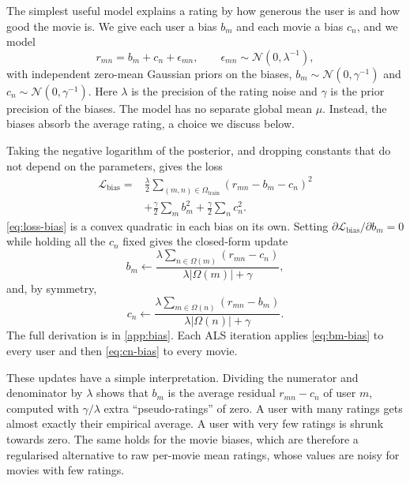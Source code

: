 \documentclass{article}
\theoremstyle{plain}
\theoremstyle{definition}
\theoremstyle{remark}
\begin{document}
The simplest useful model explains a rating by how generous the user is
and how good the movie is. We give each user a bias $b_m$ and each movie a
bias $c_n$, and we model
\begin{equation}
  r_{mn} = b_m + c_n + \epsilon_{mn}, \qquad
  \epsilon_{mn} \sim \mathcal{N}(0, \lambda^{-1}),
  \label{eq:bias-lik}
\end{equation}
with independent zero-mean Gaussian priors on the biases,
$b_m \sim \mathcal{N}(0, \gamma^{-1})$ and $c_n \sim \mathcal{N}(0, \gamma^{-1})$.
Here $\lambda$ is the precision of the rating noise and $\gamma$ is the prior
precision of the biases. The model has no separate global mean $\mu$.
Instead, the biases absorb the average rating, a choice we discuss below.

Taking the negative logarithm of the posterior, and dropping constants that
do not depend on the parameters, gives the loss
\begin{align}
  \mathcal{L}_{\text{bias}} = {}&
  \frac{\lambda}{2} \sum_{(m,n) \in \Omega_{\text{train}}}
  \left( r_{mn} - b_m - c_n \right)^2 \nonumber \\
  & + \frac{\gamma}{2} \sum_{m} b_m^2
  + \frac{\gamma}{2} \sum_{n} c_n^2 .
  \label{eq:loss-bias}
\end{align}
\cref{eq:loss-bias} is a convex quadratic in each bias on its own. Setting
$\partial \mathcal{L}_{\text{bias}} / \partial b_m = 0$ while holding all
the $c_n$ fixed gives the closed-form update
\begin{equation}
  b_m \leftarrow
  \frac{\lambda \sum_{n \in \Omega(m)} \left( r_{mn} - c_n \right)}
       {\lambda |\Omega(m)| + \gamma} ,
  \label{eq:bm-bias}
\end{equation}
and, by symmetry,
\begin{equation}
  c_n \leftarrow
  \frac{\lambda \sum_{m \in \Omega(n)} \left( r_{mn} - b_m \right)}
       {\lambda |\Omega(n)| + \gamma} .
  \label{eq:cn-bias}
\end{equation}
The full derivation is in \cref{app:bias}. Each ALS iteration applies
\cref{eq:bm-bias} to every user and then \cref{eq:cn-bias} to every movie.

These updates have a simple interpretation. Dividing the numerator and
denominator by $\lambda$ shows that $b_m$ is the average residual
$r_{mn} - c_n$ of user $m$, computed with $\gamma/\lambda$ extra
``pseudo-ratings'' of zero. A user with many ratings gets almost exactly
their empirical average. A user with very few ratings is shrunk towards
zero. The same holds for the movie biases, which are therefore a
regularised alternative to raw per-movie mean ratings, whose values are
noisy for movies with few ratings.
\end{document}
